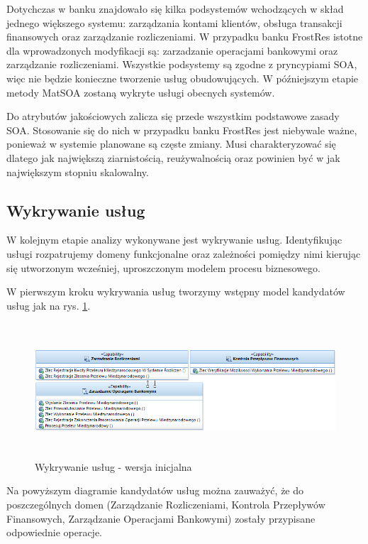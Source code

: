 Dotychczas w banku znajdowało się kilka podsystemów wchodzących w skład jednego większego systemu: zarządzania kontami klientów, obsługa transakcji finansowych oraz zarządzanie rozliczeniami. W przypadku banku FrostRes istotne dla wprowadzonych modyfikacji są: zarzadzanie operacjami bankowymi oraz zarządzanie rozliczeniami. Wszystkie podsystemy są zgodne z pryncypiami SOA, więc nie będzie konieczne tworzenie usług obudowujących. W późniejszym etapie metody MatSOA zostaną wykryte usługi obecnych systemów.

Do atrybutów jakościowych zalicza się przede wszystkim podstawowe zasady SOA. Stosowanie się do nich w przypadku banku FrostRes jest niebywale ważne, ponieważ w systemie planowane są częste zmiany. Musi charakteryzować się dlatego jak największą ziarnistością, reużywalnością oraz powinien być w jak największym stopniu skalowalny. 

\subsection{Wykrywanie usług}
W kolejnym etapie analizy wykonywane jest wykrywanie usług. Identyfikując usługi rozpatrujemy domeny funkcjonalne oraz zależności pomiędzy nimi kierując się utworzonym wcześniej, uproszczonym modelem procesu biznesowego. 

W pierwszym kroku wykrywania usług tworzymy wstępny model kandydatów usług jak na rys. \ref{service_candidates_init}.

\begin{figure}[h!tbp]
\begin{centering}
\includegraphics[width=16cm, height=5cm]{img/service_candidates_init.png}
\caption[Wykrywanie usług - wersja inicjalna]{Wykrywanie usług - wersja inicjalna}\label{service_candidates_init}
\end{centering}
\end{figure}

Na powyższym diagramie kandydatów usług można zauważyć, że do poszczególnych domen (Zarządzanie Rozliczeniami, Kontrola Przepływów Finansowych, Zarządzanie Operacjami Bankowymi) zostały przypisane odpowiednie operacje. 

